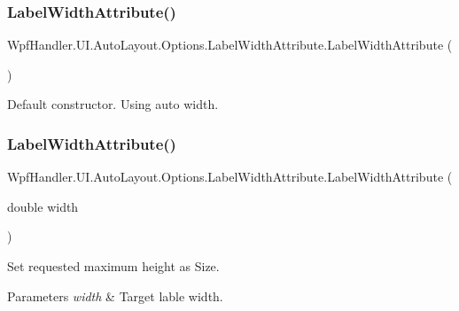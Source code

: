 \subsubsection{\texorpdfstring{Label\+Width\+Attribute()}{LabelWidthAttribute()}\hspace{0.1cm}{\footnotesize\ttfamily [1/2]}}
{\footnotesize\ttfamily Wpf\+Handler.\+U\+I.\+Auto\+Layout.\+Options.\+Label\+Width\+Attribute.\+Label\+Width\+Attribute (\begin{DoxyParamCaption}{ }\end{DoxyParamCaption})}



Default constructor. Using auto width. 

\mbox{\label{class_wpf_handler_1_1_u_i_1_1_auto_layout_1_1_options_1_1_label_width_attribute_a24991b7cdbc8d575106a41fd7573ad92}} 
\subsubsection{\texorpdfstring{Label\+Width\+Attribute()}{LabelWidthAttribute()}\hspace{0.1cm}{\footnotesize\ttfamily [2/2]}}
{\footnotesize\ttfamily Wpf\+Handler.\+U\+I.\+Auto\+Layout.\+Options.\+Label\+Width\+Attribute.\+Label\+Width\+Attribute (\begin{DoxyParamCaption}\item[{double}]{width }\end{DoxyParamCaption})}



Set requested maximum height as Size. 


\begin{DoxyParams}{Parameters}
{\em width} & Target lable width.\\
\hline
\end{DoxyParams}


